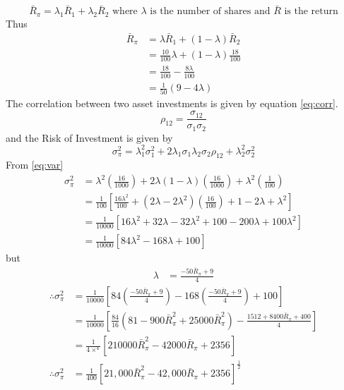 \documentclass[12pt,a4paper]{article}
\begin{document}
  		\begin{equation}
  				\bar{R}_{\pi}  =  \lambda_1 \bar{R}_1  +   \lambda_2 \bar{R}_2  \text{ where $\lambda$ is the number of shares and $\bar{R}$ is the return} 
  				\label{eq:mr}
  		\end{equation}
  	Thus
  	\begin{align*}
  			\bar{R}_{\pi}  &=   \lambda \bar{R}_1 + (1 - \lambda) \bar{R}_2\\
  									&=  \frac{10}{100} \lambda 	+ (1 - \lambda) \frac{18}{100}\\
  									&=  \frac{18}{100}  - \frac{8\lambda}{100}\\
  									&= \frac{1}{50} (9 - 4 \lambda)
  	\end{align*}
	The correlation between two asset investments is given by equation \eqref{eq:corr}.
 	\begin{equation}
 			\rho_{12}  =  \frac{\sigma_{12}}{ \sigma_1 \sigma_2  }
 				\label{eq:corr}
 	\end{equation}
 	and the Risk of Investment is given by 
 	\begin{equation}
 			\sigma_{\pi}^2  =  \lambda_1^2 \sigma_1^2   + 2 \lambda_1 \sigma_1 \lambda_2 \sigma_2 \rho_{12}  + \lambda_2^2 \sigma_2^2
 			\label{eq:var}
 	\end{equation}
 	From \eqref{eq:var} 
 	\begin{align*}
 				\sigma_{\pi}^2  &= \lambda^2 \left(   \frac{16}{1000} \right)  + 2 \lambda ( 1 -  \lambda)  \left(   \frac{16}{1000} \right)  +  \lambda^2   \left(   \frac{1}{100} \right) \\
 										&=  \frac{1}{100} \left[   \frac{16 \lambda^2 }{100} + (2 \lambda  -  2 \lambda^2)   \left( \frac{16}{100}  \right) +   1 - 2 \lambda  + \lambda^2   \right]\\
 										&= \frac{1}{10000} \left[   16 \lambda^2  + 32 \lambda - 32 \lambda^2  + 100 - 200 \lambda + 100\lambda^2   \right]\\
 										&=   \frac{1}{10000} \left[  84 \lambda^2   -  168 \lambda + 100  \right]
 	\end{align*}
 	but 
 	\begin{align*}
 			\lambda  &= \frac{  -50 \bar{R}_{\pi}  + 9 }{ 4}
 	\end{align*}
 	\begin{align*}
 			\therefore \sigma_{\pi}^2   &=   \frac{1}{10000} \left[    84 \left(  \frac{  -50 \bar{R}_{\pi}  + 9 }{ 4} \right)  - 168 \left(  \frac{  -50 \bar{R}_{\pi}  + 9 }{ 4} \right) + 100   \right]\\
 			&= \frac{1}{ 10000} \left[   \frac{84}{ 16}   \left(  81 - 900 \bar{R}_{\pi}^2   + 25000 \bar{R}_{\pi}^2 \right)   -  \frac{  1512 + 8400 \bar{ R }_{\pi}  + 400 }{ 4}   \right]\\
 			&=  \frac{1}{ 4 \times ^4}  \left[  210000\bar{R}_{\pi}^2  -  42000 \bar{R}_{\pi} + 2356   \right] \\
 			\therefore   \sigma_{\pi}^2  &= \frac{1}{400} \left[   21,000 \bar{R}_{\pi}^2 -  42,000 \bar{R}_{\pi} + 2356  \right]^{\frac{1}{2}}
 	\end{align*}
\end{document}
